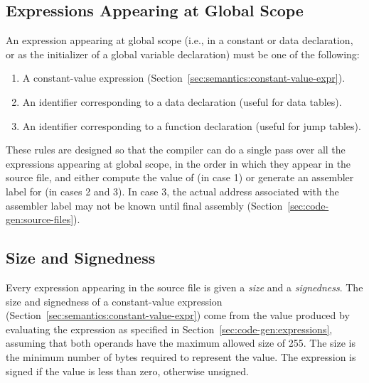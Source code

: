 \documentclass[10pt]{article}
\begin{document}
\subsection{Expressions Appearing at Global Scope}
\label{sec:semantic:global-expr}

An expression appearing at global scope (i.e., in a constant or data
declaration, or as the initializer of a global variable declaration)
must be one of the following:
%
\begin{enumerate}
%
\item A constant-value expression
  (Section~\ref{sec:semantics:constant-value-expr}).
%
\item An identifier corresponding to a data declaration (useful for
  data tables).
%
\item An identifier corresponding to a function declaration (useful
  for jump tables).
%
\end{enumerate}

These rules are designed so that the compiler can do a single pass
over all the expressions  appearing at global scope, in
the order in which they appear in the source file, and either compute
the value of  (in case 1) or generate an assembler label
for  (in cases 2 and 3). In case 3, the actual address
associated with the assembler label may not be known until final
assembly (Section~\ref{sec:code-gen:source-files}).

\subsection{Size and Signedness}
\label{sec:semantics:size}

 Every expression
appearing in the source file is given a \emph{size} and a
\emph{signedness}.  The size and signedness of a constant-value
expression (Section~\ref{sec:semantics:constant-value-expr}) come from
the value produced by evaluating the expression as specified in
Section~\ref{sec:code-gen:expressions}, assuming that both operands
have the maximum allowed size of 255.  The size is the minimum number
of bytes required to represent the value.  The expression is signed if
the value is less than zero, otherwise unsigned.
\end{document}
